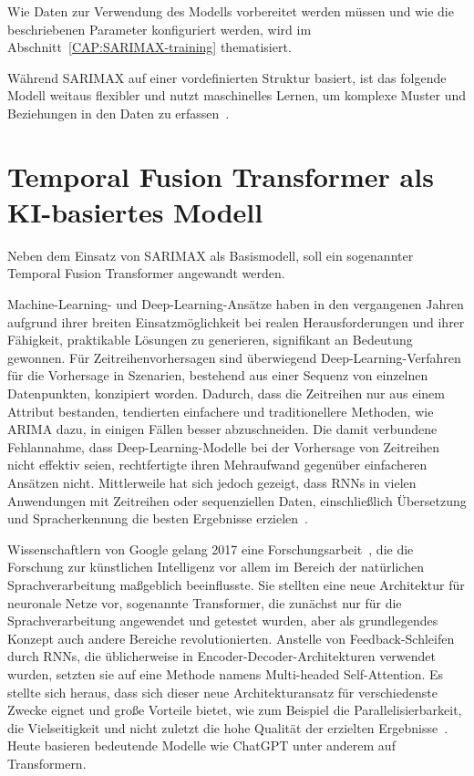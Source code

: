 Wie Daten zur Verwendung des Modells vorbereitet werden müssen und wie die beschriebenen Parameter konfiguriert werden, wird im Abschnitt~\ref{CAP:SARIMAX-training} thematisiert.

Während \ac{SARIMAX} auf einer vordefinierten Struktur basiert, ist das folgende Modell weitaus flexibler und nutzt maschinelles Lernen, um komplexe Muster und Beziehungen in den Daten zu erfassen~\cite{Lim.19.12.2019}.

\section{Temporal Fusion Transformer als KI-basiertes Modell}
Neben dem Einsatz von SARIMAX als Basismodell, soll ein sogenannter Temporal Fusion Transformer angewandt werden.

Machine-Learning- und Deep-Learning-Ansätze haben in den vergangenen Jahren aufgrund ihrer breiten Einsatzmöglichkeit bei realen Herausforderungen und ihrer Fähigkeit, praktikable Lösungen zu generieren, signifikant an Bedeutung gewonnen.
Für Zeitreihenvorhersagen sind überwiegend Deep-Learning-Verfahren für die Vorhersage in Szenarien, bestehend aus einer Sequenz von einzelnen Datenpunkten, konzipiert worden.
Dadurch, dass die Zeitreihen nur aus einem Attribut bestanden, tendierten einfachere und traditionellere Methoden, wie \ac{ARIMA} dazu, in einigen Fällen besser abzuschneiden.
Die damit verbundene Fehlannahme, dass Deep-Learning-Modelle bei der Vorhersage von Zeitreihen nicht effektiv seien, rechtfertigte ihren Mehraufwand gegenüber einfacheren Ansätzen nicht.
Mittlerweile hat sich jedoch gezeigt, dass \acp{RNN} in vielen Anwendungen mit Zeitreihen oder sequenziellen Daten, einschließlich Übersetzung und Spracherkennung die besten Ergebnisse erzielen~\cite{Lazzeri.2021}.

Wissenschaftlern von Google gelang 2017 eine Forschungsarbeit~\cite{Vaswani.2017}, die die Forschung zur künstlichen Intelligenz vor allem im Bereich der natürlichen Sprachverarbeitung maßgeblich beeinflusste.
Sie stellten eine neue Architektur für neuronale Netze vor, sogenannte Transformer, die zunächst nur für die Sprachverarbeitung angewendet und getestet wurden, aber als grundlegendes Konzept auch andere Bereiche revolutionierten.
Anstelle von Feedback-Schleifen durch \acp{RNN}, die üblicherweise in Encoder-Decoder-Architekturen verwendet wurden, setzten sie auf eine Methode namens \glqq Multi-headed Self-Attention\grqq{}.
Es stellte sich heraus, dass sich dieser neue Architekturansatz für verschiedenste Zwecke eignet und große Vorteile bietet, wie zum Beispiel die Parallelisierbarkeit, die Vielseitigkeit und nicht zuletzt die hohe Qualität der erzielten Ergebnisse~\cite{Vaswani.2017}.
Heute basieren bedeutende Modelle wie ChatGPT unter anderem auf Transformern.

